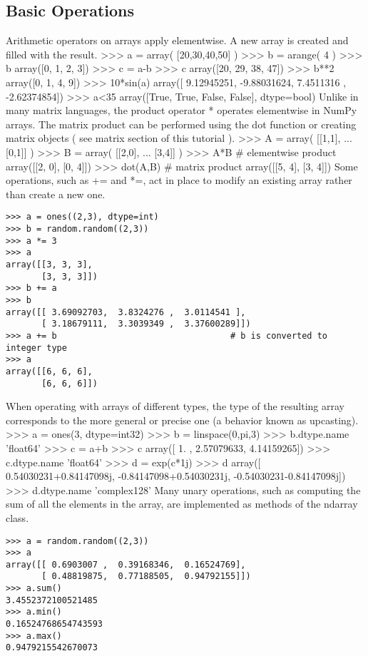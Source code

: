 \subsection{Basic Operations}
Arithmetic operators on arrays apply elementwise. A new array is created and filled with the result.
>>> a = array( [20,30,40,50] )
>>> b = arange( 4 )
>>> b
array([0, 1, 2, 3])
>>> c = a-b
>>> c
array([20, 29, 38, 47])
>>> b**2
array([0, 1, 4, 9])
>>> 10*sin(a)
array([ 9.12945251, -9.88031624,  7.4511316 , -2.62374854])
>>> a<35
array([True, True, False, False], dtype=bool)
Unlike in many matrix languages, the product operator * operates elementwise in NumPy arrays. The matrix product can be performed using the dot function or creating matrix objects ( see matrix section of this tutorial ).
>>> A = array( [[1,1],
...             [0,1]] )
>>> B = array( [[2,0],
...             [3,4]] )
>>> A*B                         # elementwise product
array([[2, 0],
       [0, 4]])
>>> dot(A,B)                    # matrix product
array([[5, 4],
       [3, 4]])
Some operations, such as += and *=, act in place to modify an existing array rather than create a new one.
\begin{verbatim}
>>> a = ones((2,3), dtype=int)
>>> b = random.random((2,3))
>>> a *= 3
>>> a
array([[3, 3, 3],
       [3, 3, 3]])
>>> b += a
>>> b
array([[ 3.69092703,  3.8324276 ,  3.0114541 ],
       [ 3.18679111,  3.3039349 ,  3.37600289]])
>>> a += b                                  # b is converted to integer type
>>> a
array([[6, 6, 6],
       [6, 6, 6]])
\end{verbatim}
When operating with arrays of different types, the type of the resulting array corresponds to the more general or precise one (a behavior known as upcasting).
>>> a = ones(3, dtype=int32)
>>> b = linspace(0,pi,3)
>>> b.dtype.name
'float64'
>>> c = a+b
>>> c
array([ 1.        ,  2.57079633,  4.14159265])
>>> c.dtype.name
'float64'
>>> d = exp(c*1j)
>>> d
array([ 0.54030231+0.84147098j, -0.84147098+0.54030231j,
       -0.54030231-0.84147098j])
>>> d.dtype.name
'complex128'
Many unary operations, such as computing the sum of all the elements in the array, are implemented as methods of the ndarray class.
\begin{verbatim}
>>> a = random.random((2,3))
>>> a
array([[ 0.6903007 ,  0.39168346,  0.16524769],
       [ 0.48819875,  0.77188505,  0.94792155]])
>>> a.sum()
3.4552372100521485
>>> a.min()
0.16524768654743593
>>> a.max()
0.9479215542670073
\end{verbatim}
